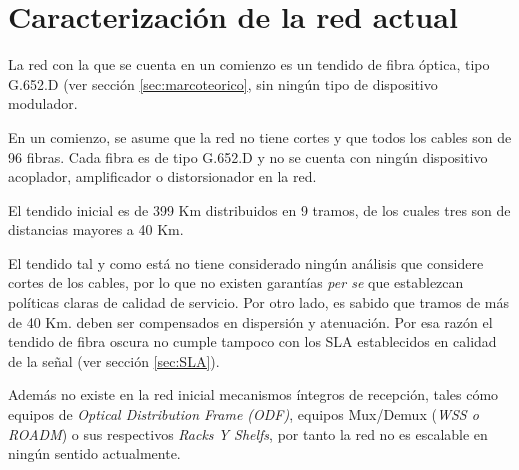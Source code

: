 \section{Caracterización de la red actual}
\label{sec:caracterizacion}

La red con la que se cuenta en un comienzo es un tendido de fibra
óptica, tipo G.652.D (ver sección \ref{sec:marcoteorico}, sin ningún tipo de dispositivo modulador.

En un comienzo, se asume que la red no tiene cortes y que todos los
cables son de 96 fibras. Cada fibra es de tipo G.652.D y no se cuenta
con ningún dispositivo acoplador, amplificador o distorsionador en la
red.

El tendido inicial es de 399 Km distribuidos en 9 tramos, de los
cuales tres son de distancias mayores a 40 Km. 

El tendido tal y como está no tiene considerado ningún análisis que
considere cortes de los cables, por lo que no existen garantías
\emph{per se} que establezcan políticas claras de calidad de
servicio. Por otro lado, es sabido que tramos de más de 40 Km. deben
ser compensados en dispersión y atenuación. Por esa razón el tendido
de fibra oscura no cumple tampoco con los SLA establecidos en calidad
de la señal (ver sección \ref{sec:SLA}).

Adem\'as no existe en la red inicial mecanismos íntegros de recepción, tales cómo equipos de \textit{Optical Distribution Frame (ODF)}, equipos Mux/Demux (\textit{WSS o ROADM}) o sus respectivos \textit{Racks Y Shelfs}, por tanto la red no es escalable en ningún sentido actualmente. 






